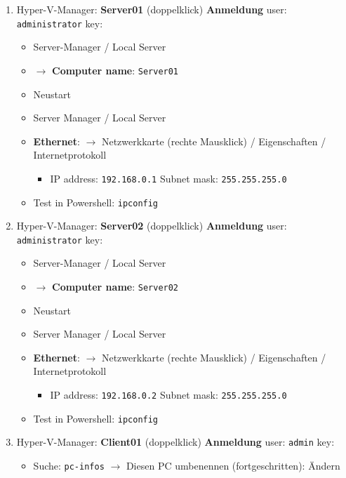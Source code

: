 \begin{enumerate}
\item
  Hyper-V-Manager: \textbf{Server01} (doppelklick) \textbf{Anmeldung}
  user: \verb|administrator| key:

  \begin{itemize}
  \item
    Server-Manager / Local Server
  \item
    $\to$ \textbf{Computer name}: \verb|Server01|
  \item
    Neustart
  \item
    Server Manager / Local Server
  \item
    \textbf{Ethernet}: $\to$ Netzwerkkarte (rechte Mausklick) /
    Eigenschaften / Internetprotokoll

    \begin{itemize}
    \item
      IP address: \verb|192.168.0.1| Subnet mask:
      \verb|255.255.255.0|
    \end{itemize}
  \item
    Test in Powershell: \verb|ipconfig|
  \end{itemize}
\item
  Hyper-V-Manager: \textbf{Server02} (doppelklick) \textbf{Anmeldung}
  user: \verb|administrator| key:

  \begin{itemize}
  \item
    Server-Manager / Local Server
  \item
    $\to$ \textbf{Computer name}: \verb|Server02|
  \item
    Neustart
  \item
    Server Manager / Local Server
  \item
    \textbf{Ethernet}: $\to$ Netzwerkkarte (rechte Mausklick) /
    Eigenschaften / Internetprotokoll

    \begin{itemize}
    \item
      IP address: \verb|192.168.0.2| Subnet mask:
      \verb|255.255.255.0|
    \end{itemize}
  \item
    Test in Powershell: \verb|ipconfig|
  \end{itemize}
\item
  Hyper-V-Manager: \textbf{Client01} (doppelklick) \textbf{Anmeldung}
  user: \verb|admin| key:

  \begin{itemize}
  \item
    Suche: \verb|pc-infos| $\to$ Diesen PC
    umbenennen (fortgeschritten): Ändern


\end{itemize}
\end{enumerate}
